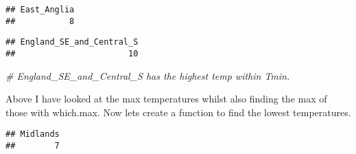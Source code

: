 \documentclass[
]{article}
\newenvironment{Shaded}{\begin{snugshade}}{\end{snugshade}}
\newcommand{\AttributeTok}[1]{\textcolor[rgb]{0.77,0.63,0.00}{#1}}
\newcommand{\CommentTok}[1]{\textcolor[rgb]{0.56,0.35,0.01}{\textit{#1}}}
\newcommand{\ConstantTok}[1]{\textcolor[rgb]{0.00,0.00,0.00}{#1}}
\newcommand{\ControlFlowTok}[1]{\textcolor[rgb]{0.13,0.29,0.53}{\textbf{#1}}}
\newcommand{\FunctionTok}[1]{\textcolor[rgb]{0.00,0.00,0.00}{#1}}
\newcommand{\NormalTok}[1]{#1}
\newcommand{\OtherTok}[1]{\textcolor[rgb]{0.56,0.35,0.01}{#1}}
\newcommand{\SpecialCharTok}[1]{\textcolor[rgb]{0.00,0.00,0.00}{#1}}
\begin{document}
\begin{verbatim}
## East_Anglia 
##           8
\end{verbatim}

\begin{Shaded}
\end{Shaded}

\begin{verbatim}
## England_SE_and_Central_S 
##                       10
\end{verbatim}

\begin{Shaded}
\begin{Highlighting}[]
\CommentTok{\# England\_SE\_and\_Central\_S has the highest temp within Tmin.}
\end{Highlighting}
\end{Shaded}

Above I have looked at the max temperatures whilst also finding the max
of those with which.max. Now lets create a function to find the lowest
temperatures.

\begin{Shaded}
\end{Shaded}

\begin{verbatim}
## Midlands 
##        7
\end{verbatim}

\begin{Shaded}
\end{Shaded}
\end{document}
